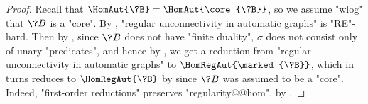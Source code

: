 \begin{proof}
	Recall that $\HomAut{\?B} = \HomAut{\core{\?B}}$, so we assume "wlog"
	that $\?B$ is a "core".
	By ,
	"regular unconnectivity in automatic graphs" is "RE"-hard.
	Then by , since $\?B$ does not have "finite
	duality", $\sigma$ does not consist only of unary "predicates",
	and hence by , we get
	a reduction from "regular unconnectivity in automatic graphs" to
	$\HomRegAut{\marked{\?B}}$, which in turns
	reduces to $\HomRegAut{\?B}$ by 
	since $\?B$ was assumed to be a "core".
	Indeed, "first-order reductions" preserves "regularity@@hom", by 
	.
\end{proof}